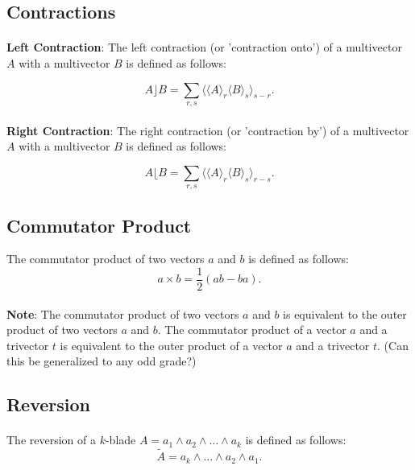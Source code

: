 \documentclass{article}
\begin{document}
\subsection{\textbf{Contractions}}

\paragraph{}\textbf{Left Contraction}: The left contraction (or 'contraction onto') of a multivector $A$ with a multivector $B$ is defined as follows:

$$A\rfloor B = \sum_{r,s} \langle \langle A \rangle_{r} \langle B \rangle_{s} \rangle_{s - r}.$$

\paragraph{}\textbf{Right Contraction}: The right contraction (or 'contraction by') of a multivector $A$ with a multivector $B$ is defined as follows:

$$A\lfloor B = \sum_{r,s} \langle \langle A \rangle_{r} \langle B \rangle_{s} \rangle_{r - s}.$$

\subsection{\textbf{Commutator Product}}
The commutator product of two vectors $a$ and $b$ is defined as follows: 
$$a \times b = \frac{1}{2}(ab - ba).$$

\paragraph{}
    \textbf{Note}: The commutator product of two vectors $a$ and $b$ is equivalent to 
    the outer product of two vectors $a$ and $b$. The commutator product of a vector $a$ and a trivector $t$ 
    is equivalent to the outer product of a vector $a$ and a trivector $t$. (Can this be generalized to any odd grade?)


\subsection{\textbf{Reversion}}

\paragraph{}The reversion of a $k$-blade $A = a_1 \wedge a_2 \wedge \ldots \wedge a_k$ is defined as follows:
$$\tilde{A} = a_k \wedge \ldots \wedge a_2 \wedge a_1.$$
\end{document}
